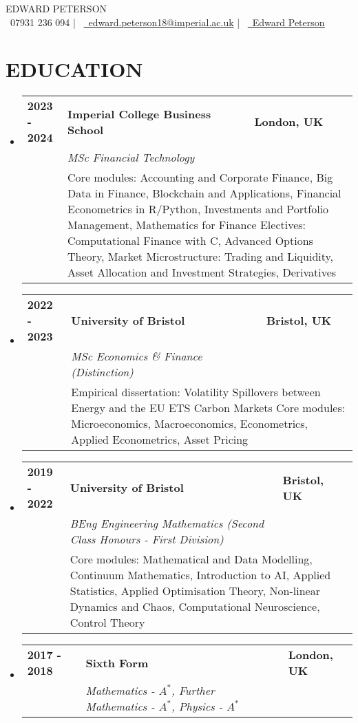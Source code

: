 \documentclass[letterpaper,10pt]{article}
\newcommand{\educationSubheading}[8]{
  \vspace{-2pt}\item
      \begin{tabular*}{1.0\textwidth}[t]{p{2.5cm}p{15.05cm}l}
    \textbf{\small #1} & \textbf{\small #2} & \textbf{\small #3} \\
    \textit{\small#4} & \textit{\small #5} & \textit{\small #6} \\
    \textit{\small#7} & \multicolumn{2}{p{17cm}}{\small #8} \\
  \end{tabular*}\vspace{-7pt}
}
\newcommand{\edalevel}[6]{
  \vspace{-2pt}\item
      \begin{tabular*}{1.0\textwidth}[t]{p{2.5cm}p{15.05cm}l}
    \textbf{\small #1} & \textbf{\small #2} & \textbf{\small #3} \\
    \textit{\small#4} & \textit{\small #5} & \textit{\small #6} \\
  \end{tabular*}\vspace{-7pt}
}
\newcommand{\resumeSubHeadingListStart}{\begin{itemize}[leftmargin=0.0in, label={}]}
\newcommand{\resumeSubHeadingListEnd}{\end{itemize}}
\begin{document}
\begin{center}
    {\Large \scshape EDWARD PETERSON} \\ \vspace{1pt}\hspace{14pt}
    \small \raisebox{-0.1\height}\faPhone\ 07931 236 094 |~ \href{mailto:ep4518@ic.ac.uk}{\raisebox{-0.2\height}\faEnvelope\  edward.peterson18@imperial.ac.uk} |~ 
    \href{https://uk.linkedin.com/in/edward-peterson-166958185}{\raisebox{-0.2\height}\faLinkedin\ \underline{Edward Peterson}}  ~

\end{center}

\def\Cplusplus{C\raisebox{0.5ex}{\tiny\textbf{++}}}
\section{\small EDUCATION}
\vspace{5pt}
\resumeSubHeadingListStart
    \educationSubheading
      {2023 - 2024}{Imperial College Business School}{London, UK}
      {}{MSc Financial Technology}{}
      {}{Core modules: Accounting and Corporate Finance, Big Data in Finance, Blockchain and Applications, Financial Econometrics in R/Python, Investments and Portfolio Management, Mathematics for Finance \newline Electives: Computational Finance with \Cplusplus, Advanced Options Theory, Market Microstructure: Trading and Liquidity, Asset Allocation and Investment Strategies, Derivatives}
    \educationSubheading
      {2022 - 2023}{University of Bristol}{Bristol, UK}
      {}{MSc Economics \& Finance (Distinction)}{}
      {}{Empirical dissertation: Volatility Spillovers between Energy and the EU ETS Carbon Markets \newline Core modules: Microeconomics, Macroeconomics, Econometrics, Applied Econometrics, Asset Pricing  
}
    \educationSubheading
      {2019 - 2022}{University of Bristol}{Bristol, UK}
      {}{BEng Engineering Mathematics (Second Class Honours - First Division)}{}
      {}{Core modules: Mathematical and Data Modelling, Continuum Mathematics, Introduction to AI, Applied Statistics, Applied Optimisation Theory, Non-linear Dynamics and Chaos, Computational Neuroscience, Control Theory}
    \edalevel{2017 - 2018}{Sixth Form}{London, UK}{}{Mathematics - $A^*$, Further Mathematics - $A^*$, Physics - $A^*$}{}
\resumeSubHeadingListEnd
\end{document}
